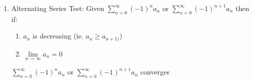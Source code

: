 \documentclass[addpoints]{exam}
\begin{document}
\begin{center}
{{\begin{enumerate}
\begin{enumerate}
            \item \(f(x)\) is decreasing 
        \end{enumerate}
        Then the convergence of \(\displaystyle\, \sum\limits_{n=0}^\infty a_n\) will be the same as the convergence of \(\displaystyle \int_{0}^\infty f(x)\, dx\) \\
        \textit{Note that the conditions of positive and decreasing must only be true \textbf{eventually}}
        \item Alternating Series Test: Given \(\displaystyle \sum\limits_{n=0}^\infty (-1)^{n}a_n \text{ or } \sum\limits_{n=0}^\infty (-1)^{n+1} a_{n}\) then if:
        \begin{enumerate}
            \item \(a_n\) is decreasing (ie. \(a_n \geq a_{n+1)}\))
            \item \(\displaystyle \lim\limits_{n\to\infty} a_n = 0\)
        \end{enumerate}
        \(\displaystyle \sum\limits_{n=0}^\infty (-1)^{n} a_n \text{ or } \sum\limits_{n=0}^\infty (-1)^{n+1} a_n\) converges
    \end{enumerate}
    }} 
\end{center}
\end{document}
